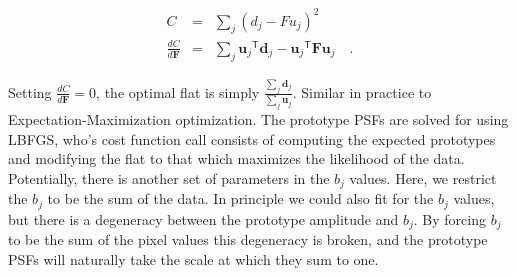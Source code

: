 \documentclass[12pt,preprint,pdftex]{aastex}
\newcommand{\vc}[1]{\mathbf{#1}}
\newcommand{\transpose}[1]{{#1}^{\!{\mathsf{T}}}}
\begin{document}
\begin{eqnarray}
C &=& \sum_j (d_j - F u_j)^2 \\
\frac{dC}{d\vc{F}} &=& \sum_j \transpose{\vc{u}_j} \vc{d}_j - \transpose{\vc{u}_j} \vc{F} \vc{u}_j
\quad .
\label{eq:flat_deriv}
\end{eqnarray}

\noindent Setting $\frac{dC}{d\vc{F}} = 0$, the optimal flat is simply 
$\frac{\sum_j \vc{d}_j}{\sum_j \vc{u}_j}$.  Similar in practice to Expectation-Maximization 
optimization.  The prototype PSFs are solved for using LBFGS, who's cost function call consists 
of computing the expected prototypes and modifying the flat to that which maximizes the 
likelihood of the data.  Potentially, there is another set of parameters in the $b_j$ values.  
Here, we restrict the $b_j$ to be the sum of the data.  In principle we could also fit for the 
$b_j$ values, but there is a degeneracy between the prototype amplitude and $b_j$.  By 
forcing $b_j$ to be the sum of the pixel values this degeneracy is broken, and the prototype 
PSFs will naturally take the scale at which they sum to one.
\end{document}
